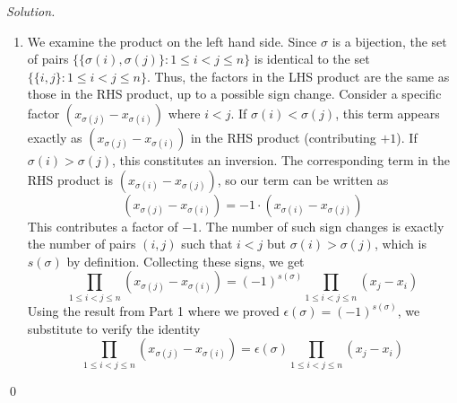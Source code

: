 \documentclass[12pt,a4paper]{article}
\newenvironment{solution}{%
  \par\noindent\textit{Solution.}\ }{\qed}
\theoremstyle{problemstyle}
\begin{document}
\begin{solution}
\begin{enumerate}[\label=\arabic*.]
    Now, we calculate $f(\sigma=(a,b))$ for some $a<_{\text{WLOG}}b$. 
    For the pair $(i,j)$ (with $i<j$) to potentially be such that $\sigma(i)>\sigma(j)$ we must have that $\{i,j\}\cap\{a,b\}\neq\emptyset$ as $\sigma$ is identity outside $\{a,b\}$. 
    We look at these pairs now: pairs of form $(i,a)$ do not result in inversions as $\sigma(i)=i<a<=\sigma(a)$, pairs of form $(i,b)$ only result in inversions for $a\leq i<b$ and there are $b-a$ such $i$ so these result in $(b-a)$ inversions, the pairs of form $(a,i)$ only result in inversions for $a<i\leq b$ resulting in $b-a+1$ inversions again and the pairs of form $(b,i)$ do not result in any inversions. 
    Thus the total number of inversions is $2(b-a)+1$ and thus $f((a,b)=(-1)^{2(b-a)+1})=-1$ and this is all we need to prove that $f\equiv\epsilon.$ 
    We have shown that $\epsilon$ and $f$ agree on transpositons($\epsilon((a,b))$ is also $-1$ for $a\neq b$ as shown in class.) and as both of these are multiplicative we see that for any $\sigma$, by first writing it as a product of transpositons $\sigma=\tau_1\cdots\tau_n$ and then using the multiplicativity as follows
    $$f(\sigma)=f(\tau_1\cdots\tau_n)=f(\tau_1)\cdots f(\tau_n)=(-1)^n=\epsilon(\tau_1)\cdots\epsilon(\tau_n)=\epsilon(\tau_1\cdots\tau_n)=\epsilon(\sigma)$$
    \item
    We examine the product on the left hand side. Since $\sigma$ is a bijection, the set of pairs $\{\{\sigma(i), \sigma(j)\} : 1 \le i < j \le n\}$ is identical to the set $\{\{i, j\} : 1 \le i < j \le n\}$. Thus, the factors in the LHS product are the same as those in the RHS product, up to a possible sign change. 
    Consider a specific factor $(x_{\sigma(j)} - x_{\sigma(i)})$ where $i < j$. 
    If $\sigma(i) < \sigma(j)$, this term appears exactly as $(x_{\sigma(j)} - x_{\sigma(i)})$ in the RHS product (contributing $+1$). 
    If $\sigma(i) > \sigma(j)$, this constitutes an inversion. The corresponding term in the RHS product is $(x_{\sigma(i)} - x_{\sigma(j)})$, so our term can be written as
    $$(x_{\sigma(j)} - x_{\sigma(i)}) = -1 \cdot (x_{\sigma(i)} - x_{\sigma(j)})$$ 
    This contributes a factor of $-1$. The number of such sign changes is exactly the number of pairs $(i, j)$ such that $i < j$ but $\sigma(i) > \sigma(j)$, which is $s(\sigma)$ by definition. 
    Collecting these signs, we get
    $$ \prod_{1 \le i < j \le n} (x_{\sigma(j)} - x_{\sigma(i)}) = (-1)^{s(\sigma)} \prod_{1 \le i < j \le n} (x_j - x_i) $$
    Using the result from Part 1 where we proved $\epsilon(\sigma) = (-1)^{s(\sigma)}$, we substitute to verify the identity 
    $$\prod_{1 \le i < j \le n} (x_{\sigma(j)} - x_{\sigma(i)}) = \epsilon(\sigma) \prod_{1 \le i < j \le n} (x_j - x_i)$$ 
    \end{enumerate}
\end{solution}
\end{document}
